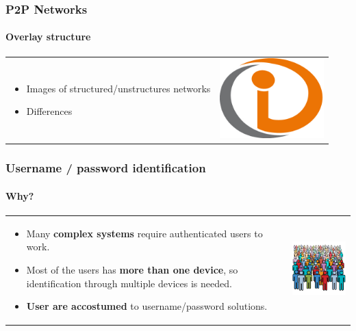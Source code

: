 \begin{frame}
\frametitle{P2P Networks}
\framesubtitle{Overlay structure}
\begin{table}
\begin{tabular}{p{7cm}p{3cm}}
\begin{itemize}
    \item Images of structured/unstructures networks
    \item Differences
\end{itemize}
&
\vspace{1.5cm}
\includegraphics[width=4cm]{img/example}\\
\end{tabular}
\end{table}
\end{frame}

\begin{frame}
\frametitle{Username / password identification}
\framesubtitle{Why?}
\begin{table}
\begin{tabular}{p{7cm}p{3cm}}
\begin{itemize}
  \item Many \textbf{complex systems} require authenticated users to work.
  \item Most of the users has \textbf{more than one device}, so identification through
    multiple devices is needed.
  \item \textbf{User are accostumed} to username/password solutions.
\end{itemize}
&
\vspace{1.5cm}
\includegraphics[width=4cm]{img/users}\\
\end{tabular}
\end{table}
\end{frame}

